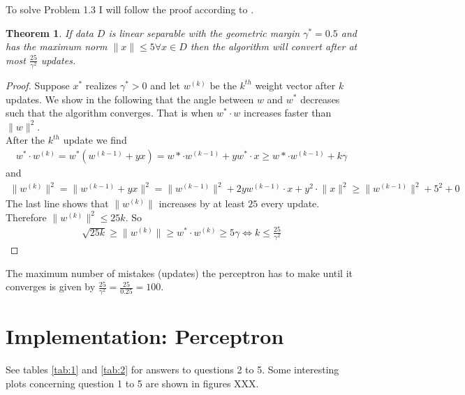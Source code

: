 \documentclass[12pt]{article}
\newtheorem{theorem}{Theorem}[section]
\begin{document}
\noindent
To solve Problem 1.3 I will follow the proof according to \cite{CIML}. 
\begin{theorem}
	If data $D$ is linear separable with the geometric margin $\gamma^* = 0.5$ and has the maximum norm $\lVert x \rVert\leq 5 \forall x \in D$ then the algorithm will convert after at most $\frac{25}{\gamma^2}$ updates. 
\end{theorem}
\begin{proof}
	Suppose $x^*$ realizes $\gamma^*>0$ and let $w^{(k)}$ be the $k^{th}$ weight vector after $k$ updates. We show in the following that the angle between $w$ and $w^*$ decreases such that the algorithm converges. That is when $w^*\cdot w$ increases faster than $\lVert w \rVert^2$.\\
	After the $k^{th}$ update we find
	\begin{align*}
		w^*\cdot w^{(k)} = w^{*}\left( w^{(k-1)}+yx \right) = w*\cdot w^{(k-1)} + yw^*\cdot x \geq w*\cdot w^{(k-1)} + k\gamma 
	\end{align*}
	and
	\begin{align*}
		\lVert w^{(k)} \rVert^2=\lVert w^{(k-1)} + yx \rVert^2 = \lVert w^{(k-1)} \rVert^2 + 2yw^{(k-1)}\cdot x + y^2\cdot\lVert x \rVert^2 \geq \lVert w^{(k-1)} \rVert^2 +5^2 +0
	\end{align*}
	The last line shows that $\lVert w^{(k)} \rVert$ increases by at least $25$ every update. Therefore $\lVert w^{(k)} \rVert^2 \leq 25k$. So
	\begin{align*}
	\sqrt{25k} \geq \lVert w^{(k)} \rVert \geq w^*\cdot w^{(k)} \geq 5\gamma \Leftrightarrow k \leq \frac{25}{\gamma^2}
	\end{align*}
\end{proof}
\noindent
The maximum number of mistakes (updates) the perceptron has to make until it converges is given by $\frac{25}{\gamma^2}=\frac{25}{0.25}=100$.

\section{Implementation: Perceptron}

See tables \ref{tab:1} and \ref{tab:2} for answers to questions 2 to 5. Some interesting plots concerning question 1 to 5 are shown in figures XXX. 
\end{document}
